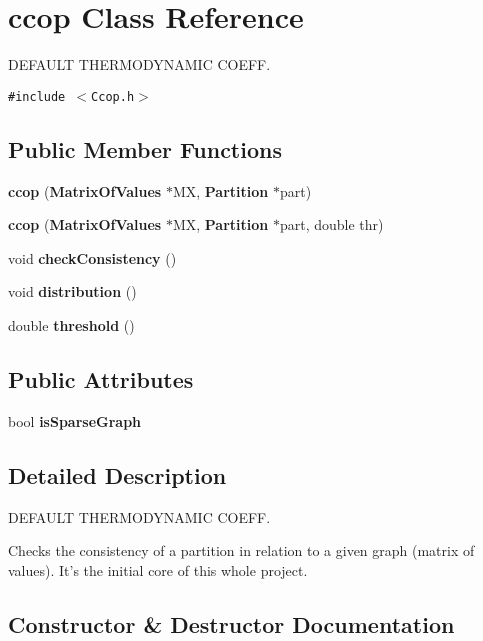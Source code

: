\section{ccop Class Reference}
\label{classccop}
DEFAULT THERMODYNAMIC COEFF.  


{\tt \#include $<$Ccop.h$>$}

\subsection*{Public Member Functions}
\begin{CompactItemize}
\item 
{\bf ccop} ({\bf Matrix\-Of\-Values} $\ast$MX, {\bf Partition} $\ast$part)
\item 
{\bf ccop} ({\bf Matrix\-Of\-Values} $\ast$MX, {\bf Partition} $\ast$part, double thr)\label{classccop_a1}

\item 
void {\bf check\-Consistency} ()\label{classccop_a2}

\item 
void {\bf distribution} ()\label{classccop_a3}

\item 
double {\bf threshold} ()\label{classccop_a4}

\end{CompactItemize}
\subsection*{Public Attributes}
\begin{CompactItemize}
\item 
bool {\bf is\-Sparse\-Graph}\label{classccop_o0}

\end{CompactItemize}


\subsection{Detailed Description}
DEFAULT THERMODYNAMIC COEFF. 

Checks the consistency of a partition in relation to a given graph (matrix of values). It's the initial core of this whole project. 



\subsection{Constructor \& Destructor Documentation}
